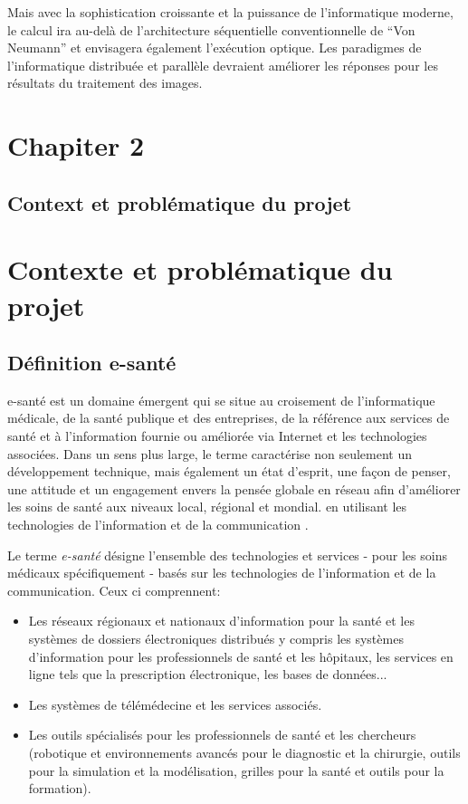 \documentclass[12pt]{article}
\begin{document}
Mais avec la sophistication croissante et la puissance de l'informatique moderne, le calcul ira au-delà de l'architecture séquentielle conventionnelle de “Von Neumann” et envisagera également l'exécution optique. Les paradigmes de l'informatique distribuée et parallèle devraient améliorer les réponses pour les résultats du traitement des images.
\newpage
\rhead{}
\section*{\Huge{Chapiter 2}}
\subsection*{\huge{Context et problématique du projet}}
\newpage
{}
\section{Contexte et problématique du projet}
\subsection{Définition e-santé}
e-santé est un domaine émergent qui se situe au croisement de l'informatique médicale, de la santé publique et des entreprises, de la référence aux services de santé et à l'information fournie ou améliorée via Internet et les technologies associées. Dans un sens plus large, le terme caractérise non seulement un développement technique, mais également un état d'esprit, une façon de penser, une attitude et un engagement envers la pensée globale en réseau afin d'améliorer les soins de santé aux niveaux local, régional et mondial. en utilisant les technologies de l'information et de la communication \cite{26}.

Le terme \textit{e-santé} désigne l'ensemble des technologies et services - pour les soins médicaux spécifiquement - basés sur les technologies de l'information et de la communication. 
Ceux ci comprennent:
\begin{itemize}
	\item Les réseaux régionaux et nationaux d'information pour la santé et les systèmes de dossiers électroniques distribués y compris les systèmes d'information pour les professionnels de santé et les hôpitaux, les services en ligne tels que la prescription électronique, les bases de données...
	\item Les systèmes de télémédecine et les services associés.
	\item Les outils spécialisés pour les professionnels de santé et les chercheurs (robotique et environnements avancés pour le diagnostic et la chirurgie, outils pour la simulation et la modélisation, grilles pour la santé et outils pour la formation).
\end{itemize}
\end{document}
